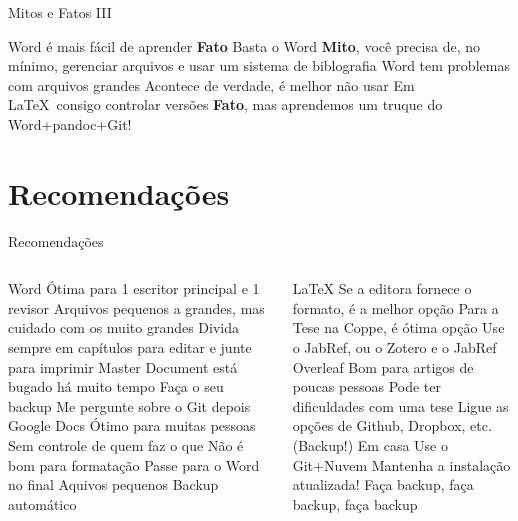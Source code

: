 \documentclass{beamer}
\begin{document}
\begin{frame}{Mitos e Fatos III }
    \begin{outline}
        \1 Word é mais fácil de aprender
        \2 \textbf{Fato}
        \1 Basta o Word
        \2 \textbf{Mito}, você precisa de, no mínimo, gerenciar arquivos e usar um sistema de biblografia
        \1 Word tem problemas com arquivos grandes
        \2 Acontece de verdade, é melhor não usar 
        \1 Em \LaTeX\ consigo controlar versões
        \2 \textbf{Fato}, mas aprendemos um truque do Word+pandoc+Git!
    \end{outline}
\end{frame}

\section{Recomendações}
\begin{frame}[shrink=20]{Recomendações}
    \begin{columns}
        \begin{column}{0.5\linewidth}
            \begin{outline}
                \1 Word
                    \2 Ótima para 1 escritor principal e 1 revisor
                    \2 Arquivos pequenos a grandes, mas cuidado com os muito grandes
                        \3 Divida sempre em capítulos para editar e junte para imprimir
                        \3 Master Document está bugado há muito tempo
                    \2 Faça o seu backup
                        \3 Me pergunte sobre o Git depois
                \1 Google Docs
                    \2 Ótimo para muitas pessoas
                    \2 Sem controle de quem faz o que
                    \2 Não é bom para formatação 
                        \3 Passe para o Word no final
                    \2 Aquivos pequenos
                        \3 Backup automático     
           \end{outline}     
        \end{column}
        \begin{column}{0.5\linewidth}
            \begin{outline}
            \1 \LaTeX
                \2 Se a editora fornece o formato, é a melhor opção
                \2 Para a Tese na Coppe, é ótima opção
                    \3 Use o JabRef, ou o Zotero e o JabRef
                \2 Overleaf
                    \3 Bom para artigos de poucas pessoas
                    \3 Pode ter dificuldades com uma tese
                    \3 Ligue as opções de Github, Dropbox, etc. (Backup!)
                \2 Em casa
                    \3 Use o Git+Nuvem
                    \3 Mantenha a instalação atualizada!
                    \3 Faça backup, faça backup, faça backup
                \end{outline}
        \end{column}
    \end{columns}
\end{frame}
\end{document}
